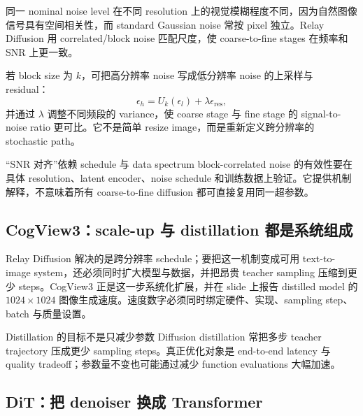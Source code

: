 同一 nominal noise level 在不同 resolution 上的视觉模糊程度不同，因为自然图像信号具有空间相关性，而 standard Gaussian noise 常按 pixel 独立。Relay Diffusion 用 correlated/block noise 匹配尺度，使 coarse-to-fine stages 在频率和 SNR 上更一致。


若 block size 为 $k$，可把高分辨率 noise 写成低分辨率 noise 的上采样与 residual：
\[
\epsilon_h=U_k(\epsilon_l)+\lambda\epsilon_{\text{res}},
\]
并通过 $\lambda$ 调整不同频段的 variance，使 coarse stage 与 fine stage 的 signal-to-noise ratio 更可比。它不是简单 resize image，而是重新定义跨分辨率的 stochastic path。

\begin{warningbox}{“SNR 对齐”依赖 schedule 与 data spectrum}
block-correlated noise 的有效性要在具体 resolution、latent encoder、noise schedule 和训练数据上验证。它提供机制解释，不意味着所有 coarse-to-fine diffusion 都可直接复用同一超参数。
\end{warningbox}


\subsection{CogView3：scale-up 与 distillation 都是系统组成}

Relay Diffusion 解决的是跨分辨率 schedule；要把这一机制变成可用 text-to-image system，还必须同时扩大模型与数据，并把昂贵 teacher sampling 压缩到更少 steps。CogView3 正是这一步系统化扩展，并在 slide 上报告 distilled model 的 $1024\!\times\!1024$ 图像生成速度。速度数字必须同时绑定硬件、实现、sampling step、batch 与质量设置。


\begin{importantbox}{Distillation 的目标不是只减少参数}
Diffusion distillation 常把多步 teacher trajectory 压成更少 sampling steps。真正优化对象是 end-to-end latency 与 quality tradeoff；参数量不变也可能通过减少 function evaluations 大幅加速。
\end{importantbox}

\subsection{DiT：把 denoiser 换成 Transformer}

